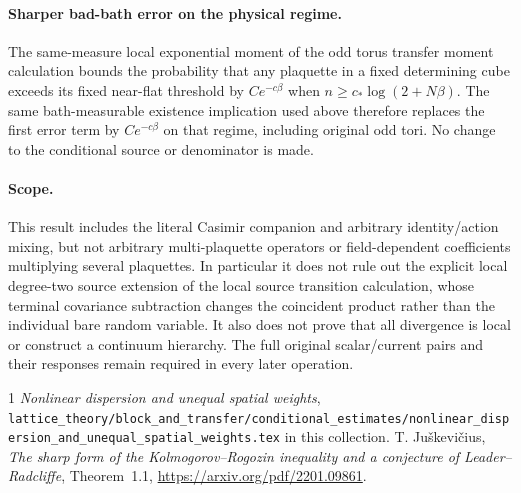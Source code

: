 \documentclass[11pt]{article}
\begin{document}
\paragraph{Sharper bad-bath error on the physical regime.}
The same-measure local exponential moment of the odd torus transfer moment calculation bounds the probability that any plaquette
in a fixed determining cube exceeds its fixed near-flat threshold by $Ce^{-c\beta}$
when $n\ge c_*\log(2+N\beta)$. The same bath-measurable existence implication used
above therefore replaces the first error term by $Ce^{-c\beta}$ on that regime, including
original odd tori. No change to the conditional source or denominator is made.

\paragraph{Scope.}
This result includes the literal Casimir companion and arbitrary identity/action mixing,
but not arbitrary multi-plaquette operators or field-dependent coefficients multiplying
several plaquettes. In particular it does not rule out the explicit local degree-two
source extension of the local source transition calculation, whose terminal covariance subtraction changes the coincident
product rather than the individual bare random variable. It also does not prove that
all divergence is local or construct a continuum hierarchy. The full original scalar/current
pairs and their responses remain required in every later operation.

\begin{thebibliography}{1}
 \emph{Nonlinear dispersion and unequal spatial weights}, \texttt{lattice\_theory/block\_and\_transfer/conditional\_estimates/nonlinear\_dispersion\_and\_unequal\_spatial\_weights.tex} in this collection.
 T. Ju\v{s}kevi\v{c}ius, \emph{The sharp form of the Kolmogorov--Rogozin
inequality and a conjecture of Leader--Radcliffe}, Theorem~1.1,
\url{https://arxiv.org/pdf/2201.09861}.
\end{thebibliography}
\end{document}
